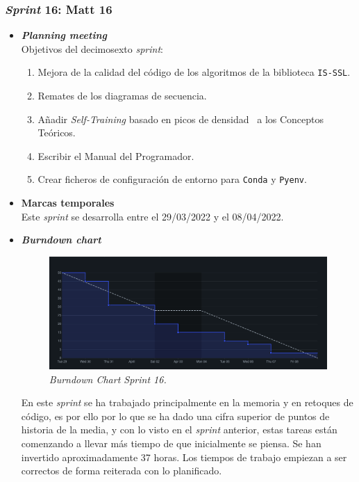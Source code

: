 \subsubsection{\textit{Sprint} 16: Matt 16}
\begin{itemize}
\item \textbf{\textit{Planning meeting}}\\
Objetivos del decimosexto \textit{sprint}:
\begin{enumerate}
\item Mejora de la calidad del código de los algoritmos de la biblioteca \texttt{IS-SSL}.
\item Remates de los diagramas de secuencia.
\item Añadir \textit{Self-Training} basado en picos de densidad~\cite{WU2018180} a los Conceptos Teóricos.
\item Escribir el Manual del Programador.
\item Crear ficheros de configuración de entorno para \texttt{Conda} y \texttt{Pyenv}.
\end{enumerate}

\item \textbf{Marcas temporales}\\
Este \textit{sprint} se desarrolla entre el 29/03/2022 y el 08/04/2022.

\item \textbf{\textit{Burndown chart}}\\
\begin{figure}
\begin{center}
\includegraphics[width=\textwidth]{../img/anexos/sprints/BD-Sprint16}
\caption{\textit{Burndown Chart Sprint 16.}}\label{fig:BD-Sprint16}
\end{center}
\end{figure}
En este \textit{sprint} se ha trabajado principalmente en la memoria y en retoques de código, es por ello por lo que se ha dado una cifra superior de puntos de historia de la media, y con lo visto en el \textit{sprint} anterior, estas tareas están comenzando a llevar más tiempo de que inicialmente se piensa. Se han invertido aproximadamente 37 horas. Los tiempos de trabajo empiezan a ser correctos de forma reiterada con lo planificado.


\end{itemize}
